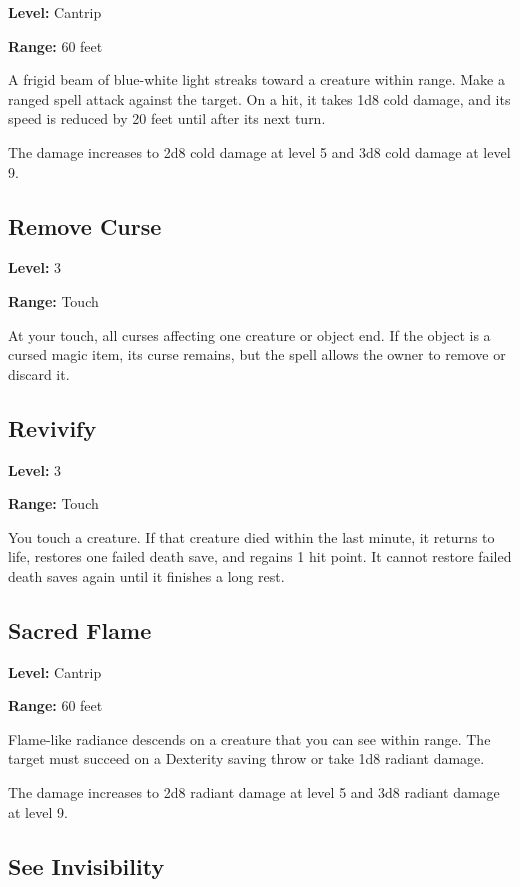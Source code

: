 \documentclass[12pt,letterpaper,twocolumn,openany,nodeprecatedcode,bg=none]{dndbook}
\let\oldsubsection\subsection
\renewcommand{\subsection}[1]{%
  \needspace{5\baselineskip}%
  \oldsubsection{#1}%
}
\begin{document}
\textbf{Level:} Cantrip

\textbf{Range:} 60 feet

A frigid beam of blue-white light streaks toward a creature within
range. Make a ranged spell attack against the target. On a hit, it takes
1d8 cold damage, and its speed is reduced by 20 feet until after its
next turn.

The damage increases to 2d8 cold damage at level 5 and 3d8 cold damage
at level 9.

\subsection{Remove Curse}\label{remove-curse}

\textbf{Level:} 3

\textbf{Range:} Touch

At your touch, all curses affecting one creature or object end. If the
object is a cursed magic item, its curse remains, but the spell allows
the owner to remove or discard it.

\subsection{Revivify}\label{revivify}

\textbf{Level:} 3

\textbf{Range:} Touch

You touch a creature. If that creature died within the last minute, it
returns to life, restores one failed death save, and regains 1 hit
point. It cannot restore failed death saves again until it finishes a
long rest.

\subsection{Sacred Flame}\label{sacred-flame}

\textbf{Level:} Cantrip

\textbf{Range:} 60 feet

Flame-like radiance descends on a creature that you can see within
range. The target must succeed on a Dexterity saving throw or take 1d8
radiant damage.

The damage increases to 2d8 radiant damage at level 5 and 3d8 radiant
damage at level 9.

\subsection{See Invisibility}\label{see-invisibility}
\end{document}
